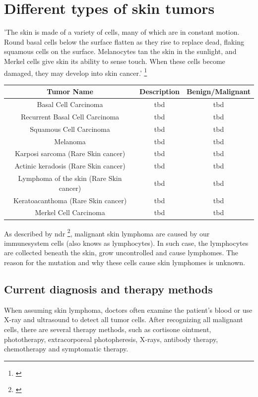 \section{Different types of skin tumors}

'The skin is made of a variety of cells, many of which are in constant motion. Round basal cells below the surface flatten as they rise to replace dead, flaking squamous cells on the surface. Melanocytes tan the skin in the sunlight, and Merkel cells give skin its ability to sense touch. When these cells become damaged, they may develop into skin cancer.' \footnote{\cite{skin_cancer_types}} 

\begin{center}
 \begin{tabular}{|| c | c | c ||} 
 \hline
Tumor Name & Description & Benign/Malignant \\ [0.5ex] 
\hline\hline
Basal Cell Carcinoma & tbd & tbd \\
\hline
Recurrent Basal Cell Carcinoma & tbd & tbd \\
 \hline
 Squamous Cell Carcinoma & tbd & tbd \\
 \hline
Melanoma & tbd & tbd \\
 \hline
 Karposi sarcoma (Rare Skin cancer) & tbd & tbd \\
 \hline
  Actinic keradosis (Rare Skin cancer) & tbd & tbd \\
\hline
Lymphoma of the skin (Rare Skin cancer) & tbd & tbd \\
\hline
 Keratoacanthoma (Rare Skin cancer) & tbd & tbd \\
\hline
 Merkel Cell Carcinoma & tbd & tbd \\
 \hline
\end{tabular}
\end{center}



As described by \ac{ndr} \footnote{\cite{ndr_lymphom}}, malignant skin lymphoma are caused by our immunesystem cells (also knows as lymphocytes). In such case, the lymphocytes are collected beneath the skin, grow uncontrolled and cause lymphomes. The reason for the mutation and why these cells cause skin lymphomes is unknown.

\subsection{Current diagnosis and therapy methods}

When assuming skin lymphoma, doctors often examine the patient's blood or use X-ray and ultrasound to detect all tumor cells. 
After recognizing all malignant cells, there are several therapy methods, such as cortisone ointment, phototherapy, extracorporeal photopheresis, X-rays, antibody therapy, chemotherapy and symptomatic therapy.

